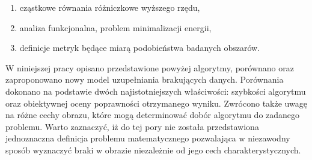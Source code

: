 \documentclass[12pt, twoside, openany]{report}
\theoremstyle{definition}
\begin{document}
\begin{enumerate}
\item
cząstkowe równania różniczkowe wyższego rzędu,
\item
analiza funkcjonalna, problem minimalizacji energii,
\item
definicje metryk będące miarą podobieństwa badanych obszarów.



\end{enumerate}
W niniejszej pracy opisano przedstawione powyżej algorytmy, porównano oraz zaproponowano nowy model uzupełniania brakujących danych. Porównania dokonano na podstawie dwóch najistotniejszych właściwości: szybkości algorytmu oraz obiektywnej oceny poprawności otrzymanego wyniku. Zwrócono także uwagę na różne cechy obrazu, które mogą determinować dobór algorytmu do zadanego problemu. Warto zaznaczyć, iż do tej pory nie została przedstawiona jednoznaczna definicja problemu matematycznego pozwalająca w niezawodny sposób wyznaczyć braki w obrazie niezależnie od jego cech charakterystycznych.
\end{document}
